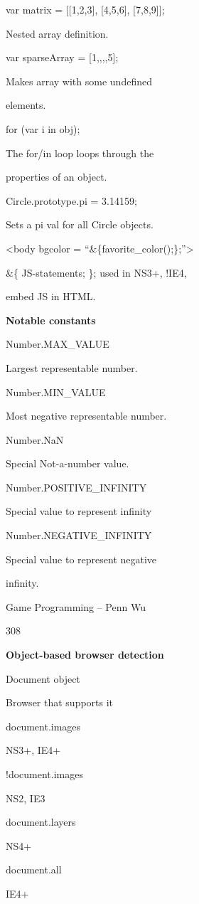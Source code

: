 \documentclass[
]{article}
\begin{document}
var matrix = {[}{[}1,2,3{]}, {[}4,5,6{]}, {[}7,8,9{]}{]};

Nested array definition.

var sparseArray = {[}1,,,,5{]};

Makes array with some undefined

elements.

for (var i in obj);

The for/in loop loops through the

properties of an object.

Circle.prototype.pi = 3.14159;

Sets a pi val for all Circle objects.

\textless body bgcolor = ``\&\{favorite\_color();\};''\textgreater{}

\&\{ JS-statements; \}; used in NS3+, !IE4,

embed JS in HTML.

\textbf{Notable constants}

Number.MAX\_VALUE

Largest representable number.

Number.MIN\_VALUE

Most negative representable number.

Number.NaN

Special Not-a-number value.

Number.POSITIVE\_INFINITY

Special value to represent infinity

Number.NEGATIVE\_INFINITY

Special value to represent negative

infinity.

Game Programming -- Penn Wu

308

\protect\hypertarget{index_split_015.htmlux5cux23p309}{}{}

\textbf{Object-based browser detection}

Document object

Browser that supports it

document.images

NS3+, IE4+

!document.images

NS2, IE3

document.layers

NS4+

document.all

IE4+
\end{document}
